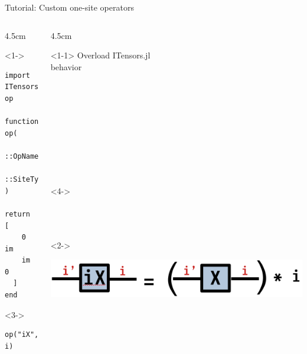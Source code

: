\begin{frame}[fragile]{Tutorial: Custom one-site operators}

\begin{columns}

\begin{column}{4.5cm}

\begin{onlyenv}<1->

\begin{lstlisting}[language=JuliaLocal, style=julia, basicstyle=\small]
import ITensors: op

function op(
  ::OpName"iX",
  ::SiteType"S=1/2"
)
  return [
    0 im
    im 0
  ]
end
\end{lstlisting}

\end{onlyenv}

\begin{onlyenv}<3->

\begin{lstlisting}[language=JuliaLocal, style=julia, basicstyle=\small]
op("iX", i)
\end{lstlisting}

\end{onlyenv}

\end{column}

\begin{column}{4.5cm}

\begin{onlyenv}<1-1>
Overload ITensors.jl \\
behavior \\
~\\
~\\
~\\
~\\
~\\
~\\
~\\
~\\
~\\
\end{onlyenv}

\begin{onlyenv}<4->
~\\
~\\
~\\
~\\
\end{onlyenv}

\begin{onlyenv}<2->
\vspace*{0.0cm}
\begin{center}
\includegraphics[width=1.0\textwidth]{
  slides/assets/iX.png
} 
\end{center}
\vspace*{0.0cm}
\end{onlyenv}


\end{column}
\end{columns}
\end{frame}
